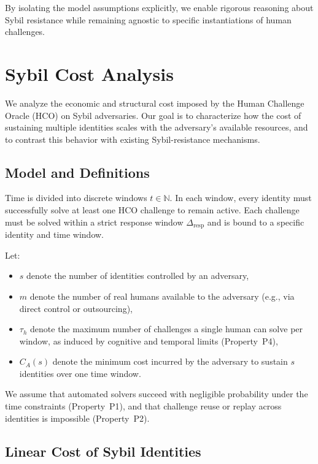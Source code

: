 \documentclass[sigconf,nonacm]{acmart}
\begin{document}
By isolating the model assumptions explicitly, we enable rigorous reasoning about Sybil resistance while remaining agnostic to specific instantiations of human challenges.

\section{Sybil Cost Analysis}

We analyze the economic and structural cost imposed by the Human Challenge Oracle (HCO) on Sybil adversaries. Our goal is to characterize how the cost of sustaining multiple identities scales with the adversary’s available resources, and to contrast this behavior with existing Sybil-resistance mechanisms.

\subsection{Model and Definitions}

Time is divided into discrete windows $t \in \mathbb{N}$. In each window, every identity must successfully solve at least one HCO challenge to remain active. Each challenge must be solved within a strict response window $\Delta_{\mathrm{resp}}$ and is bound to a specific identity and time window.

Let:
\begin{itemize}
	\item $s$ denote the number of identities controlled by an adversary,
	\item $m$ denote the number of real humans available to the adversary (e.g., via direct control or outsourcing),
	\item $\tau_h$ denote the maximum number of challenges a single human can solve per window, as induced by cognitive and temporal limits (Property~P4),
	\item $C_A(s)$ denote the minimum cost incurred by the adversary to sustain $s$ identities over one time window.
\end{itemize}

We assume that automated solvers succeed with negligible probability under the time constraints (Property~P1), and that challenge reuse or replay across identities is impossible (Property~P2).

\subsection{Linear Cost of Sybil Identities}
\end{document}
